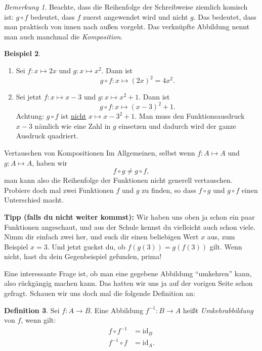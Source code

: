 \documentclass[a4paper,ngerman,12pt]{zirkelblatt1415}
\theoremstyle{definition}
\newtheorem{definition}{Definition}
\newtheorem{beispiel}[definition]{Beispiel}
\theoremstyle{remark}
\newtheorem{bem}[definition]{Bemerkung}
\begin{document}
\begin{bem}
  Beachte, dass die Reihenfolge der Schreibweise ziemlich komisch ist: $g\circ f$ bedeutet, dass $f$ zuerst angewendet wird und nicht $g$. 
  Das bedeutet, dass man praktisch von innen nach außen vorgeht. 
  Das verknüpfte Abbildung nennt man auch manchmal die \emph{Komposition}.
\end{bem}

\begin{beispiel}
  \begin{enumerate}
    \item 
    Sei $f:x\mapsto 2x$ und $g:x \mapsto x^2$. Dann ist
      \[
        g\circ f: x\mapsto (2x)^2 = 4x^2.
      \]
    \item Sei jetzt $f:x \mapsto x-3$ und $g:x \mapsto x^2 +1$. Dann ist 
    \[
        g\circ f: x\mapsto (x-3)^2 +1.
      \]
      Achtung: $g \circ f$ ist \underline{nicht} $x \mapsto x-3^2 +1$.
      Man muss den Funktionsausdruck $x-3$ nämlich wie eine Zahl in $g$ 
      einsetzen und dadurch wird der ganze Ausdruck quadriert.
 \end{enumerate}
\end{beispiel}

\begin{aufgabe}{Vertauschen von Kompositionen}
Im Allgemeinen, selbst wenn $f:A\mapsto A$ und $g:A\mapsto A$, haben wir
\[
f\circ g \neq g \circ f,
\]
man kann also die Reihenfolge der Funktionen nicht generell vertauschen. 
Probiere doch mal zwei Funktionen $f$ und $g$ zu finden, so dass $f\circ g$ und $g\circ f$ einen Unterschied macht.

\textbf{Tipp (falls du nicht weiter kommst):} Wir haben uns oben ja schon ein paar Funktionen angeschaut, und aus der Schule kennst du vielleicht auch schon viele.
Nimm dir einfach zwei her, und such dir einen beliebigen Wert $x$ aus, zum Beispiel $x=3$.
Und jetzt guckst du, ob $f(g(3)) = g(f(3))$ gilt. Wenn nicht, hast du dein Gegenbeispiel gefunden, prima!
\end{aufgabe}

Eine interessante Frage ist, ob man eine gegebene Abbildung ``umkehren'' kann, also rückgängig machen kann.
Das hatten wir uns ja auf der vorigen Seite schon gefragt. 
Schauen wir uns doch mal die folgende Definition an:
\begin{definition}
Sei $f:A\longrightarrow B$. Eine Abbildung $f^{-1}:B\longrightarrow A$ heißt \emph{Umkehrabbildung} von $f$, wenn gilt:
\begin{align*}
f\circ f^{-1}& = \text{id}_B\\
f^{-1}\circ f& = \text{id}_A.
\end{align*}
\end{definition}
\end{document}
